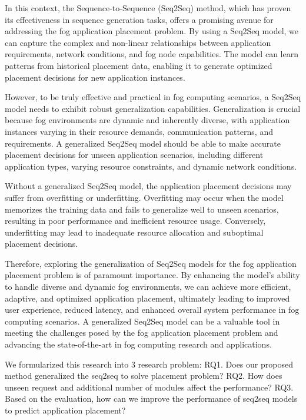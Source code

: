 \documentclass[conference]{IEEEtran}
\begin{document}
In this context, the Sequence-to-Sequence (Seq2Seq) method, which has proven its effectiveness in sequence generation tasks, offers a promising avenue for addressing the fog application placement problem. By using a Seq2Seq model, we can capture the complex and non-linear relationships between application requirements, network conditions, and fog node capabilities. The model can learn patterns from historical placement data, enabling it to generate optimized placement decisions for new application instances.

However, to be truly effective and practical in fog computing scenarios, a Seq2Seq model needs to exhibit robust generalization capabilities. Generalization is crucial because fog environments are dynamic and inherently diverse, with application instances varying in their resource demands, communication patterns, and requirements. A generalized Seq2Seq model should be able to make accurate placement decisions for unseen application scenarios, including different application types, varying resource constraints, and dynamic network conditions.

Without a generalized Seq2Seq model, the application placement decisions may suffer from overfitting or underfitting. Overfitting may occur when the model memorizes the training data and fails to generalize well to unseen scenarios, resulting in poor performance and inefficient resource usage. Conversely, underfitting may lead to inadequate resource allocation and suboptimal placement decisions.

Therefore, exploring the generalization of Seq2Seq models for the fog application placement problem is of paramount importance. By enhancing the model's ability to handle diverse and dynamic fog environments, we can achieve more efficient, adaptive, and optimized application placement, ultimately leading to improved user experience, reduced latency, and enhanced overall system performance in fog computing scenarios. A generalized Seq2Seq model can be a valuable tool in meeting the challenges posed by the fog application placement problem and advancing the state-of-the-art in fog computing research and applications.

We formularized this research into 3 research problem: 
RQ1. Does our proposed method generalized the seq2seq to solve placement problem? 
RQ2. How does unseen request and additional number of modules affect the performance?
RQ3. Based on the evaluation, how can we improve the performance of seq2seq models to predict application placement? 
\end{document}
